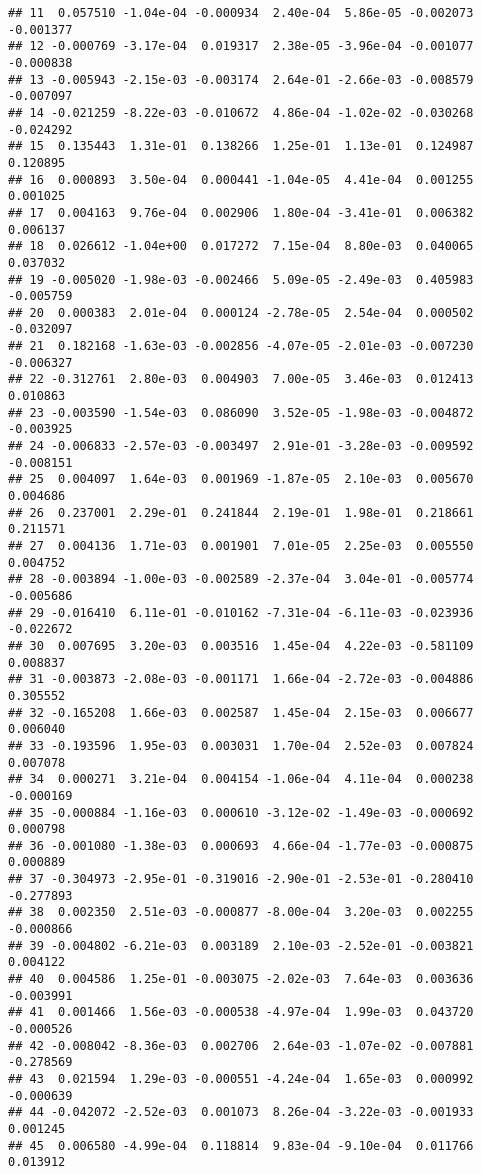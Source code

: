 \documentclass[
]{article}
\begin{document}
\begin{verbatim}
## 11  0.057510 -1.04e-04 -0.000934  2.40e-04  5.86e-05 -0.002073 -0.001377
## 12 -0.000769 -3.17e-04  0.019317  2.38e-05 -3.96e-04 -0.001077 -0.000838
## 13 -0.005943 -2.15e-03 -0.003174  2.64e-01 -2.66e-03 -0.008579 -0.007097
## 14 -0.021259 -8.22e-03 -0.010672  4.86e-04 -1.02e-02 -0.030268 -0.024292
## 15  0.135443  1.31e-01  0.138266  1.25e-01  1.13e-01  0.124987  0.120895
## 16  0.000893  3.50e-04  0.000441 -1.04e-05  4.41e-04  0.001255  0.001025
## 17  0.004163  9.76e-04  0.002906  1.80e-04 -3.41e-01  0.006382  0.006137
## 18  0.026612 -1.04e+00  0.017272  7.15e-04  8.80e-03  0.040065  0.037032
## 19 -0.005020 -1.98e-03 -0.002466  5.09e-05 -2.49e-03  0.405983 -0.005759
## 20  0.000383  2.01e-04  0.000124 -2.78e-05  2.54e-04  0.000502 -0.032097
## 21  0.182168 -1.63e-03 -0.002856 -4.07e-05 -2.01e-03 -0.007230 -0.006327
## 22 -0.312761  2.80e-03  0.004903  7.00e-05  3.46e-03  0.012413  0.010863
## 23 -0.003590 -1.54e-03  0.086090  3.52e-05 -1.98e-03 -0.004872 -0.003925
## 24 -0.006833 -2.57e-03 -0.003497  2.91e-01 -3.28e-03 -0.009592 -0.008151
## 25  0.004097  1.64e-03  0.001969 -1.87e-05  2.10e-03  0.005670  0.004686
## 26  0.237001  2.29e-01  0.241844  2.19e-01  1.98e-01  0.218661  0.211571
## 27  0.004136  1.71e-03  0.001901  7.01e-05  2.25e-03  0.005550  0.004752
## 28 -0.003894 -1.00e-03 -0.002589 -2.37e-04  3.04e-01 -0.005774 -0.005686
## 29 -0.016410  6.11e-01 -0.010162 -7.31e-04 -6.11e-03 -0.023936 -0.022672
## 30  0.007695  3.20e-03  0.003516  1.45e-04  4.22e-03 -0.581109  0.008837
## 31 -0.003873 -2.08e-03 -0.001171  1.66e-04 -2.72e-03 -0.004886  0.305552
## 32 -0.165208  1.66e-03  0.002587  1.45e-04  2.15e-03  0.006677  0.006040
## 33 -0.193596  1.95e-03  0.003031  1.70e-04  2.52e-03  0.007824  0.007078
## 34  0.000271  3.21e-04  0.004154 -1.06e-04  4.11e-04  0.000238 -0.000169
## 35 -0.000884 -1.16e-03  0.000610 -3.12e-02 -1.49e-03 -0.000692  0.000798
## 36 -0.001080 -1.38e-03  0.000693  4.66e-04 -1.77e-03 -0.000875  0.000889
## 37 -0.304973 -2.95e-01 -0.319016 -2.90e-01 -2.53e-01 -0.280410 -0.277893
## 38  0.002350  2.51e-03 -0.000877 -8.00e-04  3.20e-03  0.002255 -0.000866
## 39 -0.004802 -6.21e-03  0.003189  2.10e-03 -2.52e-01 -0.003821  0.004122
## 40  0.004586  1.25e-01 -0.003075 -2.02e-03  7.64e-03  0.003636 -0.003991
## 41  0.001466  1.56e-03 -0.000538 -4.97e-04  1.99e-03  0.043720 -0.000526
## 42 -0.008042 -8.36e-03  0.002706  2.64e-03 -1.07e-02 -0.007881 -0.278569
## 43  0.021594  1.29e-03 -0.000551 -4.24e-04  1.65e-03  0.000992 -0.000639
## 44 -0.042072 -2.52e-03  0.001073  8.26e-04 -3.22e-03 -0.001933  0.001245
## 45  0.006580 -4.99e-04  0.118814  9.83e-04 -9.10e-04  0.011766  0.013912

\end{verbatim}
\end{document}
